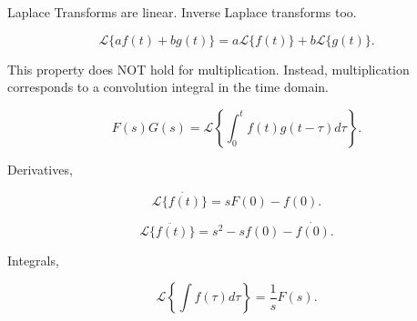 \documentclass[12pt, a4paper]{report}
\begin{document}
  Laplace Transforms are linear. Inverse Laplace transforms too.

  \[
      \mathcal{L}\{af(t) + bg(t)\} = a \mathcal{L}\{f(t)\} + b \mathcal{L}\{g(t)\}
    .\]

  This property does NOT hold for multiplication. Instead, multiplication corresponds to a convolution integral in the time domain.

  \[
      F(s)G(s) = \mathcal{L}\left\{\int_0^t f(t)g(t - \tau) d\tau\right\}
    .\]

  Derivatives,

  \[
      \mathcal{L}\{\dot{f(t)}\} = sF(0) - f(0)
    .\]

  \[
      \mathcal{L}\{\ddot{f(t)}\} = s ^2 - sf(0) - \dot{f(0)}
    .\]

  Integrals,

  \[
      \mathcal{L}\left\{\int f(\tau)d \tau \right\} = \frac{1}{s} F(s)
    .\]
\end{document}
